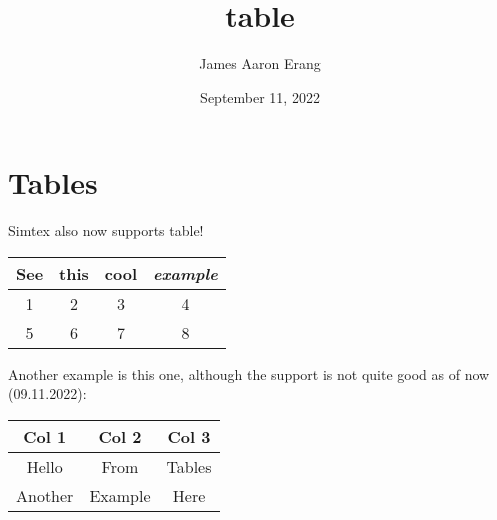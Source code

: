 \documentclass[12pt, UTF8]{article}
\title{table}
\author{James Aaron Erang}
\date{September 11, 2022}
\begin{document}
	\maketitle
	
	\section{Tables}
	
	Simtex also now supports table!
	
	\begin{center}
		\begin{tabular}{c | c | c | c}
			See & \textbf{this} & cool & \textit{example} \\
			\hline
			1 & 2 & 3 & 4 \\
	
			5 & 6 & 7 & 8 \\
	
		\end{tabular}
	\end{center}
	
	Another example is this one, although the support is not quite good as of now (09.11.2022):
	
	\begin{center}
		\begin{tabular}{c | c | c}
			Col 1 & Col 2 & Col 3 \\
			\hline
			Hello & From & Tables \\
	
			Another & Example & Here \\
	
		\end{tabular}
	\end{center}
\end{document}
